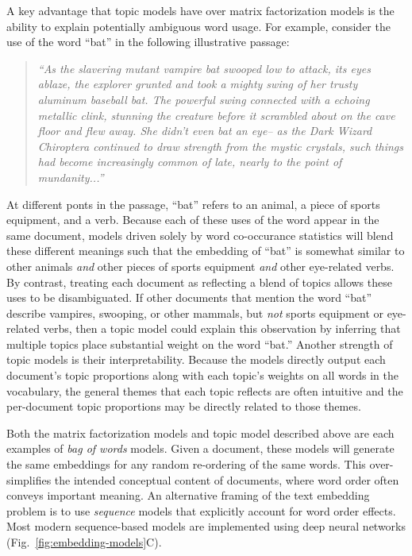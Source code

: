 \documentclass{article}
\begin{document}
A key advantage that topic models have over matrix factorization models is the ability to explain potentially ambiguous word usage.  For example, consider the use of the word ``bat'' in the following illustrative passage:
\begin{quote}
  \textit{``As the slavering mutant vampire bat swooped low to attack, its eyes ablaze, the explorer grunted and took a mighty swing of her trusty aluminum baseball bat.  The powerful swing connected with a echoing metallic \textit{clink}, stunning the creature before it scrambled about on the cave floor and flew away.  She didn't even bat an eye-- as the Dark Wizard Chiroptera continued to draw strength from the mystic crystals, such things had become increasingly common of late, nearly to the point of mundanity...''}
  \end{quote}
At different ponts in the passage, ``bat'' refers to an animal, a piece of sports equipment, and a verb.  Because each of these uses of the word appear in the same document, models driven solely by word co-occurance statistics will blend these different meanings such that the embedding of ``bat'' is somewhat similar to other animals \textit{and} other pieces of sports equipment \textit{and} other eye-related verbs.  By contrast, treating each document as reflecting a blend of topics allows these uses to be disambiguated.  If other documents that mention the word ``bat'' describe vampires, swooping, or other mammals, but \textit{not} sports equipment or eye-related verbs, then a topic model could explain this observation by inferring that multiple topics place substantial weight on the word ``bat.''  Another strength of topic models is their interpretability.  Because the models directly output each document's topic proportions along with each topic's weights on all words in the vocabulary, the general themes that each topic reflects are often intuitive and the per-document topic proportions may be directly related to those themes.

Both the matrix factorization models and topic model described above are each examples of \textit{bag of words} models.  Given a document, these models will generate the same embeddings for any random re-ordering of the same words.  This over-simplifies the intended conceptual content of documents, where word order often conveys important meaning.  An alternative framing of the text embedding problem is to use \textit{sequence} models that explicitly account for word order effects.  Most modern sequence-based models are implemented using deep neural networks (Fig.~\ref{fig:embedding-models}C).
\end{document}
